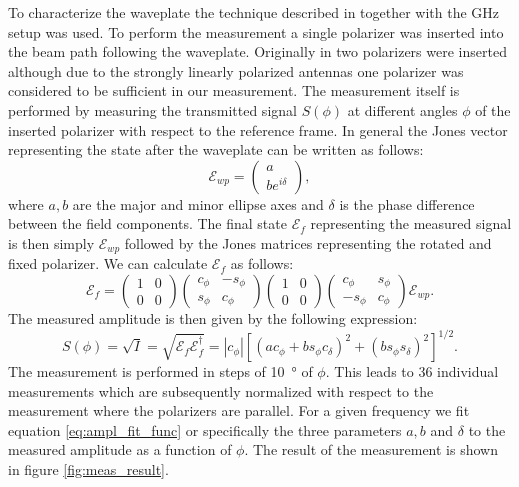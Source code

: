 To characterize the waveplate the technique described in \cite{Masson2006} together with the GHz setup was used. To perform the measurement a single polarizer was inserted into the beam path following the waveplate. Originally in \cite{Masson2006} two polarizers were inserted although due to the strongly linearly polarized antennas one polarizer was considered to be sufficient in our measurement. The measurement itself is performed by measuring the transmitted signal $S(\phi)$ at different angles $\phi$ of the inserted polarizer with respect to the reference frame. In general the Jones vector representing the state after the waveplate can be written as follows:
\begin{equation}
    \bm{\mathcal{E}}_{wp}= 
    \begin{pmatrix}
    a \\
    be^{i\delta}
    \end{pmatrix},
\end{equation}
where $a,b$ are the major and minor ellipse axes and $\delta$ is the phase difference between the field components. The final state $\bm{\mathcal{E}}_{f}$ representing the measured signal is then simply $\bm{\mathcal{E}}_{wp}$ followed by the Jones matrices representing the rotated and fixed polarizer. We can calculate $\bm{\mathcal{E}}_{f}$ as follows:
\begin{equation}
    \bm{\mathcal{E}}_{f}= 
    \begin{pmatrix}
        1 & 0\\
        0 & 0
    \end{pmatrix}
    \begin{pmatrix}
        c_{\phi} & -s_{\phi}\\
        s_{\phi} & c_{\phi}
    \end{pmatrix}
    \begin{pmatrix}
        1 & 0\\
        0 & 0
    \end{pmatrix}
    \begin{pmatrix}
        c_{\phi} & s_{\phi}\\
        -s_{\phi} & c_{\phi}
    \end{pmatrix}
    \bm{\mathcal{E}}_{wp}.
\end{equation}
The measured amplitude is then given by the following expression:
\begin{equation}
    S(\phi)=\sqrt{I} = \sqrt{\bm{\mathcal{E}}_{f} \bm{\mathcal{E}}_{f}^{\dagger}} = |c_{\phi}|\left[(ac_{\phi}+bs_{\phi}c_{\delta})^2 + (bs_{\phi}s_{\delta})^2\right]^{1/2}.
    \label{eq:ampl_fit_func}
\end{equation}
The measurement is performed in steps of \SI{10}{\degree} of $\phi$. This leads to 36 individual measurements which are subsequently normalized with respect to the measurement where the polarizers are parallel. For a given frequency we fit equation \ref{eq:ampl_fit_func} or specifically the three parameters $a,b$ and $\delta$ to the measured amplitude as a function of $\phi$. The result of the measurement is shown in figure \ref{fig:meas_result}. 


